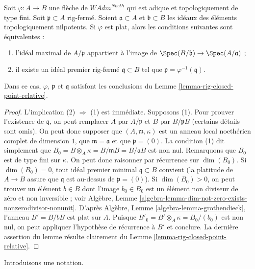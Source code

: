 \begin{lemma}
\label{lemma-rig-closed-point-in-image}
Soit $\varphi : A \to B$ une flèche de $\textit{WAdm}^{Noeth}$
qui est adique et topologiquement de type fini.
Soit $\mathfrak p \subset A$ rig-fermé.
Soient $\mathfrak a \subset A$ et $\mathfrak b \subset B$
les idéaux des éléments topologiquement nilpotents. Si $\varphi$
est plat, alors les conditions suivantes sont équivalentes :
\begin{enumerate}
\item l'idéal maximal de $A/\mathfrak p$ appartient à l'image de
$\Spec(B/\mathfrak b) \to \Spec(A/\mathfrak a)$ ;
\item il existe un idéal premier rig-fermé $\mathfrak q \subset B$
tel que $\mathfrak p = \varphi^{-1}(\mathfrak q)$.
\end{enumerate}
Dans ce cas, $\varphi$, $\mathfrak p$ et $\mathfrak q$
satisfont les conclusions du Lemme \ref{lemma-rig-closed-point-relative}.
\end{lemma}

\begin{proof}
L'implication (2) $\Rightarrow$ (1) est immédiate. Supposons (1).
Pour prouver l'existence de $\mathfrak q$,
on peut remplacer $A$ par $A/\mathfrak p$ et $B$ par $B/\mathfrak p B$
(certains détails sont omis). On peut donc supposer que $(A, \mathfrak m, \kappa)$
est un anneau local noethérien complet de dimension $1$,
que $\mathfrak m = \mathfrak a$ et que $\mathfrak p = (0)$. La condition (1)
dit simplement que $B_0 = B \otimes_A \kappa = B/\mathfrak m B = B/\mathfrak a B$
est non nul. Remarquons que $B_0$ est de type fini sur $\kappa$.
On peut donc raisonner par récurrence sur $\dim(B_0)$.
Si $\dim(B_0) = 0$, tout idéal premier minimal $\mathfrak q \subset B$
convient (la platitude de $A \to B$ assure que $\mathfrak q$ est
au-dessus de $\mathfrak p = (0)$).
Si $\dim(B_0) > 0$, on peut trouver un élément $b \in B$
dont l'image $b_0 \in B_0$ est un élément non diviseur de zéro
et non inversible ; voir Algèbre, Lemme
\ref{algebra-lemma-dim-not-zero-exists-nonzerodivisor-nonunit}.
D'après Algèbre, Lemme \ref{algebra-lemma-grothendieck},
l'anneau $B' = B/bB$ est plat sur $A$. Puisque
$B'_0 = B' \otimes_A \kappa = B_0/(b_0)$ est non nul,
on peut appliquer l'hypothèse de récurrence à $B'$ et conclure.
La dernière assertion du lemme résulte clairement du
Lemme \ref{lemma-rig-closed-point-relative}.
\end{proof}

\noindent
Introduisons une notation.

